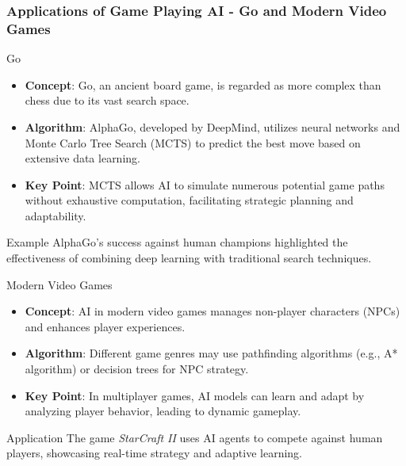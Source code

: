 \documentclass[aspectratio=169]{beamer}
\begin{document}
\begin{frame}[fragile]
    \frametitle{Applications of Game Playing AI - Go and Modern Video Games}
    \begin{block}{Go}
        \begin{itemize}
            \item \textbf{Concept}: Go, an ancient board game, is regarded as more complex than chess due to its vast search space.
            \item \textbf{Algorithm}: AlphaGo, developed by DeepMind, utilizes neural networks and Monte Carlo Tree Search (MCTS) to predict the best move based on extensive data learning.
            \item \textbf{Key Point}: MCTS allows AI to simulate numerous potential game paths without exhaustive computation, facilitating strategic planning and adaptability.
        \end{itemize}
        \begin{block}{Example}
            AlphaGo's success against human champions highlighted the effectiveness of combining deep learning with traditional search techniques.
        \end{block}
    \end{block}

    \begin{block}{Modern Video Games}
        \begin{itemize}
            \item \textbf{Concept}: AI in modern video games manages non-player characters (NPCs) and enhances player experiences.
            \item \textbf{Algorithm}: Different game genres may use pathfinding algorithms (e.g., A* algorithm) or decision trees for NPC strategy.
            \item \textbf{Key Point}: In multiplayer games, AI models can learn and adapt by analyzing player behavior, leading to dynamic gameplay.
        \end{itemize}
        \begin{block}{Application}
            The game \textit{StarCraft II} uses AI agents to compete against human players, showcasing real-time strategy and adaptive learning.
        \end{block}
    \end{block}
    
\end{frame}
\end{document}
